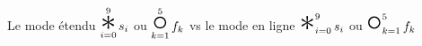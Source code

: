 \documentclass[border=3pt]{standalone}
\newcommand{\bigstar}{%
  \mathop{\Huge\mathlarger{\mathlarger{*}}}%
}
\newcommand{\bigcompo}{%
  \mathop{\Huge\mathlarger{\mathlarger{\circ}}}%
}
\begin{document}
Le mode étendu
$\displaystyle \bigstar_{i = 0}^{9} s_i$
ou
$\displaystyle \bigcompo_{k = 1}^{5} f_k$
vs le mode en ligne 
$\bigstar_{i = 0}^{9} s_i$ ou $\bigcompo_{k = 1}^{5} f_k$
\end{document}
